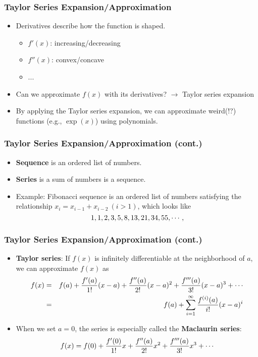 \documentclass[pdflatex, 12pt]{beamer}
\begin{document}
\begin{frame}
\frametitle{Taylor Series Expansion/Approximation}
\begin{itemize}
\item Derivatives describe how the function is shaped.
 \begin{itemize}
 \item $f'(x)$: increasing/decreasing
 \item $f''(x)$: convex/concave
 \item ...
 \end{itemize}
\vspace{0.4cm}
\item Can we approximate $f(x)$ with its derivatives? $\rightarrow$ Taylor series expansion
\vspace{0.4cm}
\item By applying the Taylor series expansion, we can approximate weird(!?) functions (e.g., $\exp(x)$) using polynomials. 
\end{itemize}
\end{frame}

\begin{frame}
\frametitle{Taylor Series Expansion/Approximation (cont.)}
\begin{itemize}
\item \textbf{Sequence} is an ordered list of numbers.
\vspace{0.4cm}
\item \textbf{Series} is a sum of numbers is a sequence.
\vspace{0.4cm}
\item Example: Fibonacci sequence is an ordered list of numbers satisfying the relationship $x_{i} = x_{i - 1} + x_{i - 2} \ (i > 1)$, which looks like
 \begin{equation}
 1, 1, 2, 3, 5, 8, 13, 21, 34, 55, \cdots, \notag
 \end{equation}
\end{itemize}
\end{frame}

\begin{frame}
\frametitle{Taylor Series Expansion/Approximation (cont.)}
\begin{itemize}
\item \textbf{Taylor series}: If $f(x)$ is infinitely differentiable at the neighborhood of $a$, we can approximate $f(x)$ as 
 {\footnotesize
 \begin{eqnarray}
 f(x) &=& f(a) + \frac{f'(a)}{1!}(x - a) + \frac{f''(a)}{2!}(x - a)^2 + \frac{f'''(a)}{3!}(x - a)^3 + \cdots \notag \\
 &=& f(a) + \sum_{i = 1}^{\infty} \frac{f^{(i)} (a)}{i!}(x - a)^i \notag
 \end{eqnarray}
 }
\vspace{0.2cm}
\item When we set $a = 0$, the series is especially called the \textbf{Maclaurin series}:
 {\footnotesize
 \begin{equation}
 f(x) = f(0) + \frac{f'(0)}{1!}x + \frac{f''(a)}{2!}x^2 + \frac{f'''(a)}{3!}x^3 + \cdots \notag
 \end{equation}
 }
\end{itemize}
\end{frame}
\end{document}
